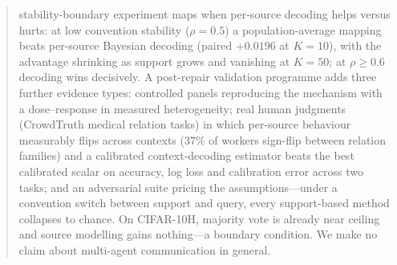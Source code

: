 \begin{abstract}
stability-boundary experiment maps when per-source decoding helps versus
hurts: at low convention stability ($\rho=0.5$) a population-average
mapping beats per-source Bayesian decoding (paired $+0.0196$ at $K=10$),
with the advantage shrinking as support grows and vanishing at $K=50$;
at $\rho \geq 0.6$ decoding wins decisively. A post-repair
validation programme adds three further evidence types: controlled
panels reproducing the mechanism with a dose--response in measured
heterogeneity; real human judgments (CrowdTruth medical relation
tasks) in which per-source behaviour measurably flips across
contexts (37\% of workers sign-flip between relation families) and a
calibrated context-decoding estimator beats the best calibrated
scalar on accuracy, log loss and calibration error across two
tasks; and an adversarial suite pricing the assumptions---under a
convention switch between support and query, every support-based
method collapses to chance. On CIFAR-10H, majority vote is already
near ceiling and source modelling gains nothing---a boundary
condition. We make no claim about multi-agent communication in
general.
\end{abstract}


